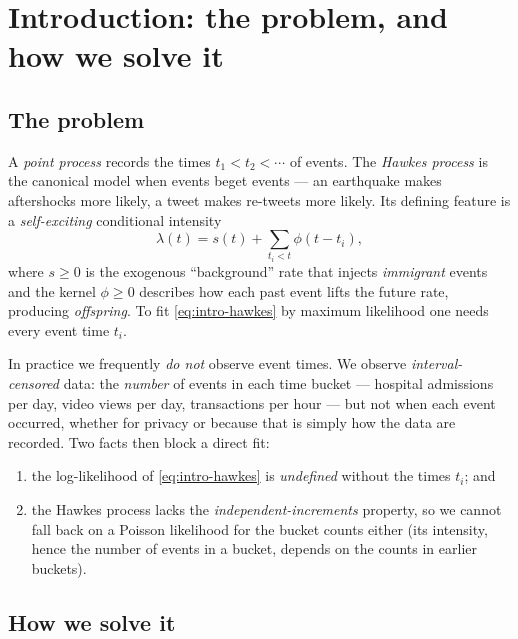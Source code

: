 \section{Introduction: the problem, and how we solve it}
\label{sec:intro}

\subsection{The problem}

A \emph{point process} records the times $t_1<t_2<\cdots$ of events. The
\emph{Hawkes process} is the canonical model when events beget events --- an
earthquake makes aftershocks more likely, a tweet makes re-tweets more likely.
Its defining feature is a \emph{self-exciting} conditional intensity
\begin{equation}
\lambda(t)=s(t)+\sum_{t_i<t}\phi(t-t_i),
\label{eq:intro-hawkes}
\end{equation}
where $s\ge 0$ is the exogenous ``background'' rate that injects \emph{immigrant}
events and the kernel $\phi\ge 0$ describes how each past event lifts the future
rate, producing \emph{offspring}. To fit \eqref{eq:intro-hawkes} by maximum
likelihood one needs every event time $t_i$.

In practice we frequently \emph{do not} observe event times. We observe
\emph{interval-censored} data: the \emph{number} of events in each time bucket ---
hospital admissions per day, video views per day, transactions per hour --- but
not when each event occurred, whether for privacy or because that is simply how
the data are recorded. Two facts then block a direct fit:
\begin{enumerate}[leftmargin=2.2em]
\item the log-likelihood of \eqref{eq:intro-hawkes} is \emph{undefined} without
the times $t_i$; and
\item the Hawkes process lacks the \emph{independent-increments} property, so we
cannot fall back on a Poisson likelihood for the bucket counts either (its
intensity, hence the number of events in a bucket, depends on the counts in
earlier buckets).
\end{enumerate}

\subsection{How we solve it}

